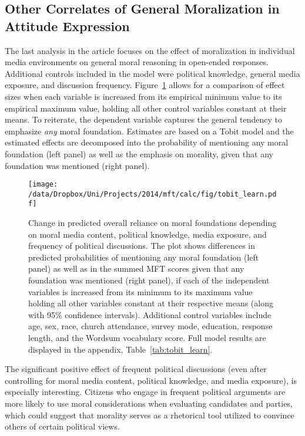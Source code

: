 \clearpage
\subsection{Other Correlates of General Moralization in Attitude Expression}

The last analysis in the article focuses on the effect of moralization in individual media environments on general moral reasoning in open-ended responses. Additional controls included in the model were political knowledge, general media exposure, and discussion frequency. Figure~\ref{fig:tobit_learn} allows for a comparison of effect sizes when each variable is increased from its empirical minimum value to its empirical maximum value, holding all other control variables constant at their means. To reiterate, the dependent variable captures the general tendency to emphasize \textit{any} moral foundation. Estimates are based on a Tobit model and the estimated effects are decomposed into the probability of mentioning any moral foundation (left panel) as well as the emphasis on morality, given that any foundation was mentioned (right panel).

\begin{figure}[h]\centering
\texttt{[image: /data/Dropbox/Uni/Projects/2014/mft/calc/fig/tobit\_learn.pdf]}
\caption[Effect of moral media content on moral reasoning in open-ended responses controlling for political interest measures]{Change in predicted overall reliance on moral foundations depending on moral media content, political knowledge, media exposure, and frequency of political discussions. The plot shows differences in predicted probabilities of mentioning any moral foundation (left panel) as well as in the summed MFT scores given that any foundation was mentioned (right panel), if each of the independent variables is increased from its minimum to its maximum value holding all other variables constant at their respective means (along with 95\% confidence intervals). Additional control variables include age, sex, race, church attendance, survey mode, education, response length, and the Wordsum vocabulary score. Full model results are displayed in the appendix, Table~\ref{tab:tobit_learn}.
}\label{fig:tobit_learn}
\end{figure}

The significant positive effect of frequent political discussions (even after controlling for moral media content, political knowledge, and media exposure), is especially interesting. Citizens who engage in frequent political arguments are more likely to use moral considerations when evaluating candidates and parties, which could suggest that morality serves as a rhetorical tool utilized to convince others of certain political views.


